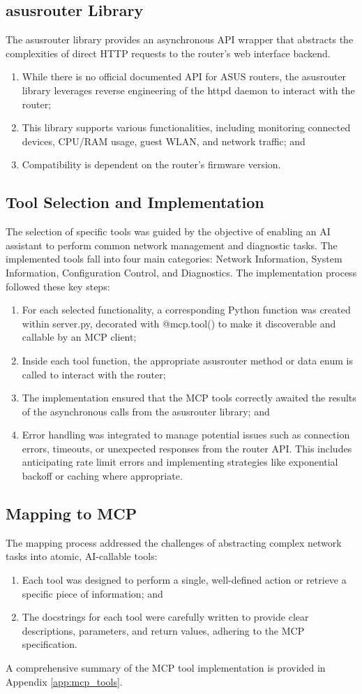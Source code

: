 \subsection{asusrouter Library}
The asusrouter library provides an asynchronous API wrapper that abstracts the complexities of direct HTTP requests to the router's web interface backend.
\begin{enumerate}
\item While there is no official documented API for ASUS routers, the asusrouter library leverages reverse engineering of the httpd daemon to interact with the router;
\item This library supports various functionalities, including monitoring connected devices, CPU/RAM usage, guest WLAN, and network traffic; and
\item Compatibility is dependent on the router's firmware version.
\end{enumerate}
\subsection{Tool Selection and Implementation}
The selection of specific tools was guided by the objective of enabling an AI assistant to perform common network management and diagnostic tasks. The implemented tools fall into four main categories: Network Information, System Information, Configuration Control, and Diagnostics.
The implementation process followed these key steps:
\begin{enumerate}
\item For each selected functionality, a corresponding Python function was created within server.py, decorated with @mcp.tool() to make it discoverable and callable by an MCP client;
\item Inside each tool function, the appropriate asusrouter method or data enum is called to interact with the router;
\item The implementation ensured that the MCP tools correctly awaited the results of the asynchronous calls from the asusrouter library; and
\item Error handling was integrated to manage potential issues such as connection errors, timeouts, or unexpected responses from the router API. This includes anticipating rate limit errors and implementing strategies like exponential backoff or caching where appropriate.
\end{enumerate}
\subsection{Mapping to MCP}
The mapping process addressed the challenges of abstracting complex network tasks into atomic, AI-callable tools:
\begin{enumerate}
\item Each tool was designed to perform a single, well-defined action or retrieve a specific piece of information; and
\item The docstrings for each tool were carefully written to provide clear descriptions, parameters, and return values, adhering to the MCP specification.
\end{enumerate}
A comprehensive summary of the MCP tool implementation is provided in Appendix \ref{app:mcp_tools}.
